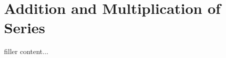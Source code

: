 \section{Addition and Multiplication of Series}\label{sec:addition-and-multiplication-of-series}

filler content...

